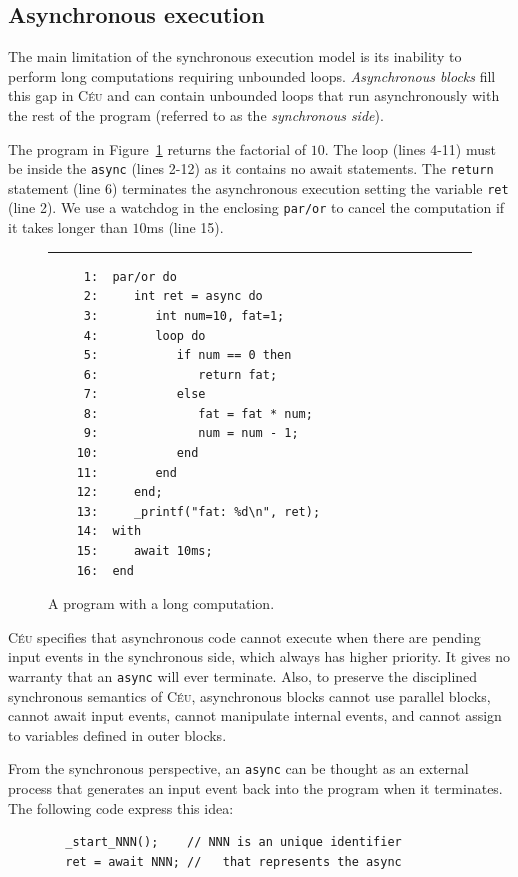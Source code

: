 \documentclass[11pt,a4paper]{article}
\newcommand{\2}{\;\;}
\newcommand{\5}{\;\;\;\;\;}
\newcommand{\CEU}{\textsc{C\'{e}u}}
\newcommand{\code}[1] {{\small{\texttt{#1}}}}
\begin{document}
\subsection{Asynchronous execution}
\label{sec:ceu:async}

The main limitation of the synchronous execution model is its inability to 
perform long computations requiring unbounded loops.
\emph{Asynchronous blocks} fill this gap in \CEU{} and can contain unbounded 
loops that run asynchronously with the rest of the program (referred to as the 
\emph{synchronous side}).

The program in Figure~\ref{lst:ceu:async} returns the factorial of $10$.
The loop (lines 4-11) must be inside the \code{async} (lines 2-12) as it 
contains no await statements.
The \code{return} statement (line 6) terminates the asynchronous execution 
setting the variable \code{ret} (line 2).
We use a watchdog in the enclosing \code{par/or} to cancel the computation if 
it takes longer than $10$ms (line 15).

\begin{figure}[h]
\rule{15cm}{0.37pt}
{\small
\begin{verbatim}
     1:  par/or do
     2:     int ret = async do
     3:        int num=10, fat=1;
     4:        loop do
     5:           if num == 0 then
     6:              return fat;
     7:           else
     8:              fat = fat * num;
     9:              num = num - 1;
    10:           end
    11:        end
    12:     end;
    13:     _printf("fat: %d\n", ret);
    14:  with
    15:     await 10ms;
    16:  end
\end{verbatim}
}
\caption{ A program with a long computation.
\label{lst:ceu:async}
}
\end{figure}

\CEU{} specifies that asynchronous code cannot execute when there are pending 
input events in the synchronous side, which always has higher priority.
It gives no warranty that an \code{async} will ever terminate.
Also, to preserve the disciplined synchronous semantics of \CEU{}, asynchronous 
blocks cannot use parallel blocks, cannot await input events, cannot manipulate 
internal events, and cannot assign to variables defined in outer blocks.

From the synchronous perspective, an \code{async} can be thought as an external 
process that generates an input event back into the program when it terminates.
The following code express this idea:

{\small
\begin{verbatim}
        _start_NNN();    // NNN is an unique identifier
        ret = await NNN; //   that represents the async
\end{verbatim}
}
\end{document}
